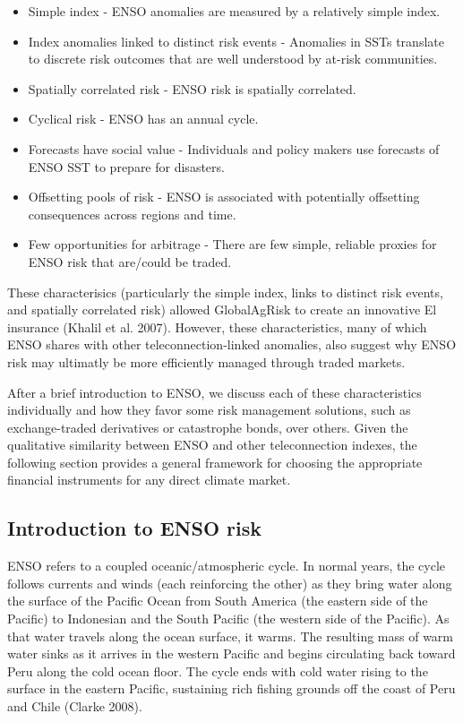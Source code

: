 \documentclass[article]{jss}
\begin{document}
\begin{itemize}
\itemsep1pt\parskip0pt
\item
  Simple index - ENSO anomalies are measured by a relatively simple
  index.
\item
  Index anomalies linked to distinct risk events - Anomalies in SSTs
  translate to discrete risk outcomes that are well understood by
  at-risk communities.
\item
  Spatially correlated risk - ENSO risk is spatially correlated.
\item
  Cyclical risk - ENSO has an annual cycle.
\item
  Forecasts have social value - Individuals and policy makers use
  forecasts of ENSO SST to prepare for disasters.
\item
  Offsetting pools of risk - ENSO is associated with potentially
  offsetting consequences across regions and time.
\item
  Few opportunities for arbitrage - There are few simple, reliable
  proxies for ENSO risk that are/could be traded.
\end{itemize}

These characterisics (particularly the simple index, links to distinct
risk events, and spatially correlated risk) allowed GlobalAgRisk to
create an innovative El  insurance (Khalil et al. 2007).
However, these characteristics, many of which ENSO shares with other
teleconnection-linked anomalies, also suggest why ENSO risk may
ultimatly be more efficiently managed through traded markets.

After a brief introduction to ENSO, we discuss each of these
characteristics individually and how they favor some risk management
solutions, such as exchange-traded derivatives or catastrophe bonds,
over others. Given the qualitative similarity between ENSO and other
teleconnection indexes, the following section provides a general
framework for choosing the appropriate financial instruments for any
direct climate market.

\subsection{Introduction to ENSO risk}\label{introduction-to-enso-risk}

ENSO refers to a coupled oceanic/atmospheric cycle. In normal years, the
cycle follows currents and winds (each reinforcing the other) as they
bring water along the surface of the Pacific Ocean from South America
(the eastern side of the Pacific) to Indonesian and the South Pacific
(the western side of the Pacific). As that water travels along the ocean
surface, it warms. The resulting mass of warm water sinks as it arrives
in the western Pacific and begins circulating back toward Peru along the
cold ocean floor. The cycle ends with cold water rising to the surface
in the eastern Pacific, sustaining rich fishing grounds off the coast of
Peru and Chile (Clarke 2008).
\end{document}

